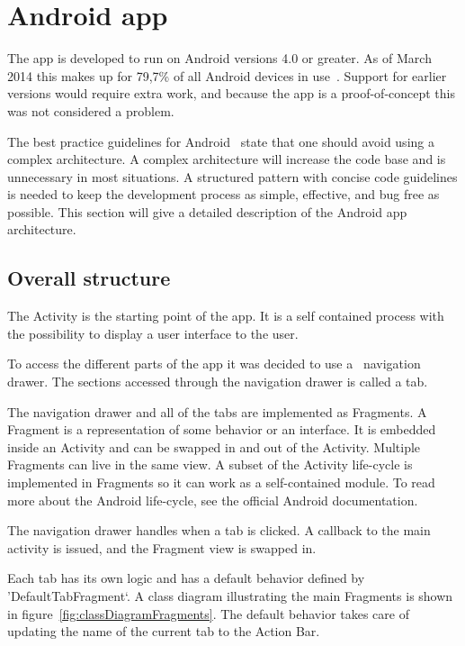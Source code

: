 \section{Android app}
\label{sec:arch_app}
The app is developed to run on Android versions 4.0 or greater. As of March 2014 this makes up for 79,7\% of all Android devices in use~\cite{AndroidDeviceFragmentation}.
Support for earlier versions would require extra work, and because the app is a proof-of-concept this was not considered a problem.

The best practice guidelines for Android~\cite{androidPracticePerformance} state that one should avoid using a complex architecture. A complex architecture will increase the code base and is unnecessary in most situations. A structured pattern with concise code guidelines is needed to keep the development process as simple, effective, and bug free as possible. This section will give a detailed description of the Android app architecture. 

\subsection{Overall structure}
The Activity is the starting point of the app. It is a self contained process with the possibility to display a user interface to the user.

To access the different parts of the app it was decided to use a ~\gls{navigation drawer}. The sections accessed through the navigation drawer is called a tab. 

The navigation drawer and all of the tabs are implemented as Fragments. A Fragment is a representation of some behavior or an interface. It is embedded inside an Activity and can be swapped in and out of the Activity. Multiple Fragments can live in the same view. A subset of the Activity life-cycle is implemented in Fragments so it can work as a self-contained module. To read more about the Android life-cycle, see the official Android documentation.~\cite{androiddoc}

The navigation drawer handles when a tab is clicked. A callback to the main activity is issued, and the Fragment view is swapped in.

Each tab has its own logic and has a default behavior defined by 'DefaultTabFragment`. A class diagram illustrating the main Fragments is shown in figure~\ref{fig:classDiagramFragments}. The default behavior takes care of updating the name of the current tab to the Action Bar.

